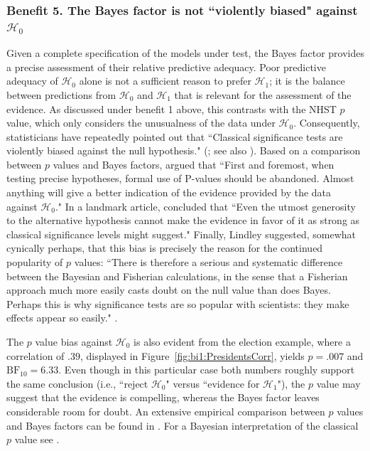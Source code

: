 \subsubsection{Benefit 5. The Bayes factor is not ``violently biased" against $\mathcal{H}_0$}
Given a complete specification of the models under test, the Bayes factor provides a precise assessment of their relative predictive adequacy. Poor predictive adequacy of $\mathcal{H}_0$ alone is not a sufficient reason to prefer $\mathcal{H}_1$; it is the balance between predictions from $\mathcal{H}_0$ and $\mathcal{H}_1$ that is relevant for the assessment of the evidence. As discussed under benefit 1 above, this contrasts with the NHST $p$ value, which only considers the unusualness of the data under $\mathcal{H}_0$. Consequently, statisticians have repeatedly pointed out that ``Classical significance tests are violently biased against the null hypothesis." (; see also ). Based on a comparison between $p$ values and Bayes factors, \cite[p. 330]{BergerDelampady1987} argued that ``First and foremost, when testing precise hypotheses, formal use of P-values should be abandoned. Almost anything will give a better indication of the evidence provided by the data against $\mathcal{H}_0$." In a landmark article,  concluded that ``Even the utmost generosity to the alternative hypothesis cannot make the evidence in favor of it as strong as classical significance levels might suggest." Finally, Lindley suggested, somewhat cynically perhaps, that this bias is precisely the reason for the continued popularity of $p$ values: ``There is therefore a serious and systematic difference between the Bayesian and Fisherian calculations, in the sense that a Fisherian approach much more easily casts doubt on the null value than does Bayes. Perhaps this is why significance tests are so popular with scientists: they make effects appear so easily." \cite[p. 502]{Lindley1986Comment}.

The $p$ value bias against $\mathcal{H}_0$ is also evident from the election example, where a correlation of $.39$, displayed in Figure~\ref{fig:bi1:PresidentsCorr}, yields $p = .007$ and $\text{BF}_{10} = 6.33$. Even though in this particular case both numbers roughly support the same conclusion (i.e., ``reject $\mathcal{H}_0$" versus ``evidence for $\mathcal{H}_1$"), the $p$ value may suggest that the evidence is compelling, whereas the Bayes factor leaves considerable room for doubt. An extensive empirical comparison between $p$ values and Bayes factors can be found in  . For a Bayesian interpretation of the classical $p$ value see .

